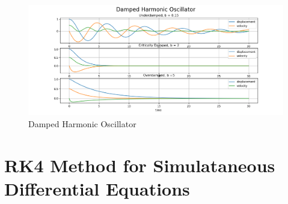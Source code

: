 \documentclass{article}
\begin{document}
\newpage
\begin{figure}[h]
    \centering
    \includegraphics[width=15cm,height=13cm \textwidth]{2nd_order_diff_using_rk2/Figure_2.png}
\caption{Damped Harmonic Oscillator}
\end{figure}

\clearpage
\section{RK4 Method for Simulataneous Differential Equations}

\end{document}
